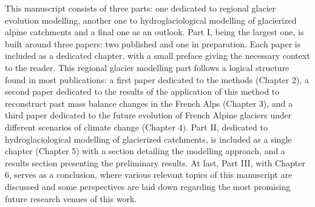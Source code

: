 This manuscript consists of three parts: one dedicated to regional glacier evolution modelling, another one to hydroglaciological modelling of glacierized  alpine catchments and a final one as an outlook. Part I, being the largest one, is built around three papers: two published and one in preparation. Each paper is included as a dedicated chapter, with a small preface giving the necessary context to the reader. This regional glacier modelling part follows a logical structure found in most publications: a first paper dedicated to the methods (Chapter 2), a second paper dedicated to the results of the application of this method to reconstruct past mass balance changes in the French Alps (Chapter 3), and a third paper dedicated to the future evolution of French Alpine glaciers under different scenarios of climate change (Chapter 4). Part II, dedicated to hydroglaciological modelling of glacierized catchments, is included as a single chapter (Chapter 5) with a section detailing the modelling approach, and a results section presenting the preliminary results. At last, Part III, with Chapter 6, serves as a conclusion, where various relevant topics of this manuscript are discussed and some perspectives are laid down regarding the most promising future research venues of this work.